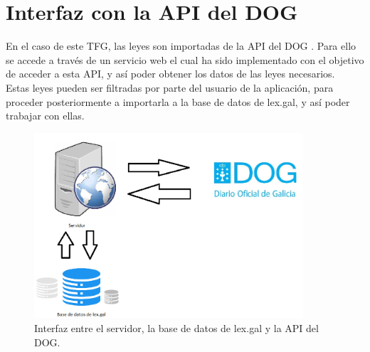 \section{Interfaz con la API del DOG}

En el caso de este TFG, las leyes son importadas de la API del DOG \cite{dog}. Para ello se accede a través de un servicio web el cual ha sido implementado con el objetivo de acceder a esta API, y así poder obtener los datos de las leyes necesarios.
\\

Estas leyes pueden ser filtradas por parte del usuario de la aplicación, para proceder posteriormente a importarla a la base de datos de lex.gal, y así poder trabajar con ellas.

\begin{figure}[H]
\centerline{\includegraphics[width=10cm]{figuras/interfazDOG.png}}
\caption{Interfaz entre el servidor, la base de datos de lex.gal y la API del DOG.}
\label{enlaceInterfazDOG}
\end{figure}